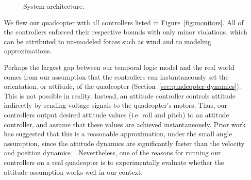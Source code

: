 \begin{figure}[t]
  \centering

     \caption{System architecture.}
     \label{fig:arch}
\end{figure}

We flew our quadcopter with all controllers listed in
Figure~\ref{fig:monitors}.  All of the controllers enforced their
respective bounds with only minor violations, which can be attributed to
un-modeled forces such as wind and to modeling approximations.

Perhaps the largest gap between our temporal logic model and the real world
comes from our assumption that the controllers can instantaneously set the
orientation, or attitude, of the quadcopter
(Section~\ref{sec:quadcopter-dynamics}).  This is not possible in reality.
Instead, an attitude controller controls attitude indirectly by sending
voltage signals to the quadcopter's motors.  Thus, our controllers output
desired attitude values (i.e. roll and pitch) to an attitude controller,
and assume that these values are achieved instantaneously.  Prior work has
suggested that this is a reasonable approximation, under the small angle
assumption, since the attitude dynamics are significantly faster than the
velocity and position dynamics~\cite{Gillula2011}.  Nevertheless, one of
the reasons for running our controllers on a real quadcopter is to
experimentally evaluate whether the attitude assumption works well in our
context.

